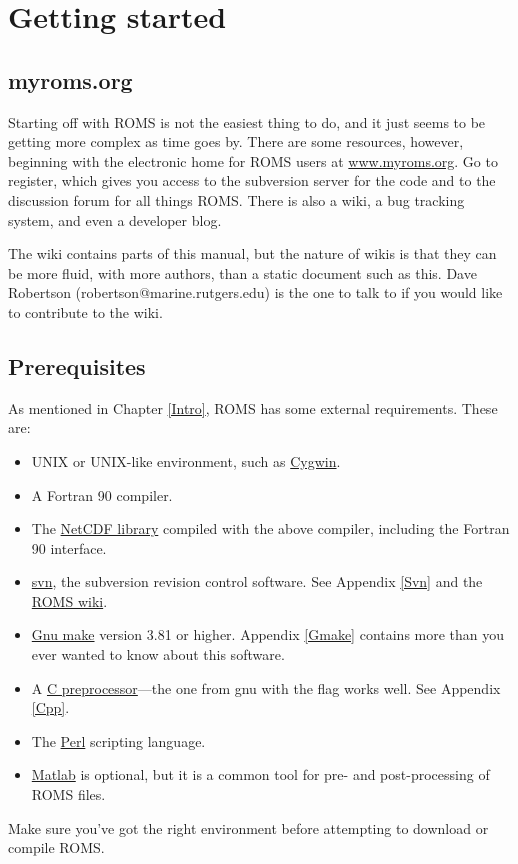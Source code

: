 \section{Getting started}
\label{Starting}

\subsection{myroms.org}
\label{Myroms}
Starting off with ROMS is not the easiest thing to do, and it just
seems to be getting more complex as time goes by. There are
some resources, however, beginning with the
electronic home for ROMS users at
\href{http://www.myroms.org}{www.myroms.org}. Go to register,
which gives you access to the subversion server for the code and to
the  discussion forum for all things ROMS. There is also a wiki,
a bug tracking system, and even a developer blog.

The wiki contains parts of this manual, but the nature of wikis is that
they can be more fluid, with more authors, than a static document such
as this. Dave Robertson (robertson@marine.rutgers.edu) is the one to
talk to if you would like to contribute to the wiki.

\subsection{Prerequisites}
As mentioned in Chapter \ref{Intro}, ROMS has some external
requirements. These are:
\begin{itemize}
    \item UNIX or UNIX-like environment, such as
      \href{http://www.redhat.com/services/custom/cygwin/}{Cygwin}.
    \item A Fortran 90 compiler.
    \item The
      \href{http://www.unidata.ucar.edu/software/netcdf/index.html}{NetCDF
      library} compiled with the above compiler, including the
      Fortran 90 interface.
    \item \href{http://subversion.tigris.org}{svn}, the subversion
      revision control software. See Appendix \ref{Svn} and the
      \href{https://www.myroms.org/wiki/index.php/Subversion}{ROMS wiki}.
    \item \href{http://www.gnu.org/software/make/}{Gnu make} version
      3.81 or higher. Appendix \ref{Gmake} contains more than you
      ever wanted to know about this software.
    \item A \href{http://en.wikipedia.org/wiki/C_preprocessor}{C
      preprocessor}---the one from gnu with the 
      flag works well. See Appendix \ref{Cpp}.
    \item The \href{http://www.perl.org}{Perl} scripting language.
    \item \href{http://www.mathworks.com/products/matlab/}{Matlab} is
      optional, but it is a common tool for pre- and post-processing
      of ROMS files.
\end{itemize}
Make sure you've got the right environment before attempting to
download or compile ROMS.

